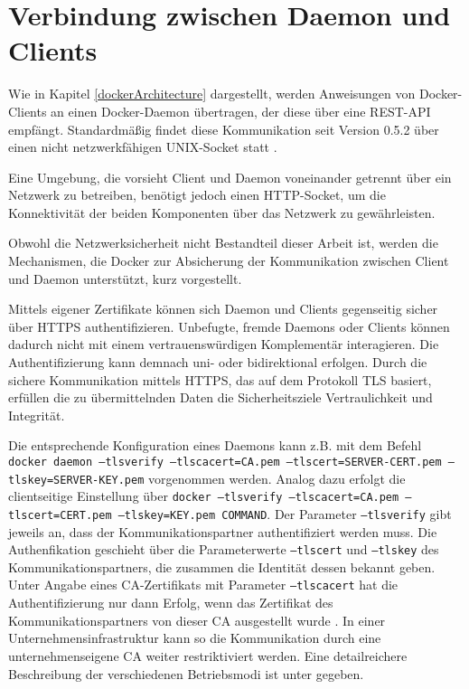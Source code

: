 \documentclass[../main.tex]{subfiles}
\begin{document}


  \section{Verbindung zwischen Daemon und Clients}
  \label{conClientServer}
    Wie in Kapitel \ref{dockerArchitecture} dargestellt, werden Anweisungen von Docker-Clients an einen Docker-Daemon übertragen, der diese über eine REST-API empfängt. Standardmäßig findet diese Kommunikation seit Version 0.5.2 über einen nicht netzwerkfähigen UNIX-Socket statt \cite{ https://docs.docker.com/engine/security/security/ }.

    Eine Umgebung, die vorsieht Client und Daemon voneinander getrennt über ein Netzwerk zu betreiben, benötigt jedoch einen HTTP-Socket, um die Konnektivität der beiden Komponenten über das Netzwerk zu gewährleisten.

    Obwohl die Netzwerksicherheit nicht Bestandteil dieser Arbeit ist, werden die Mechanismen, die Docker zur Absicherung der Kommunikation zwischen Client und Daemon unterstützt, kurz vorgestellt.

    Mittels eigener Zertifikate können sich Daemon und Clients gegenseitig sicher über HTTPS authentifizieren. Unbefugte, fremde Daemons oder Clients können dadurch nicht mit einem vertrauenswürdigen Komplementär interagieren. Die Authentifizierung kann demnach uni- oder bidirektional erfolgen. Durch die sichere Kommunikation mittels HTTPS, das auf dem Protokoll TLS basiert, erfüllen die zu übermittelnden Daten die Sicherheitsziele Vertraulichkeit und Integrität.

    Die entsprechende Konfiguration eines Daemons kann z.B. mit dem Befehl \texttt{docker daemon --tlsverify --tlscacert=CA.pem --tlscert=SERVER-CERT.pem --tlskey=SERVER-KEY.pem} vorgenommen werden. Analog dazu erfolgt die clientseitige Einstellung über \texttt{docker --tlsverify --tlscacert=CA.pem --tlscert=CERT.pem --tlskey=KEY.pem COMMAND}. Der Parameter \texttt{--tlsverify} gibt jeweils an, dass der Kommunikationspartner authentifiziert werden muss. Die Authenfikation geschieht über die Parameterwerte \texttt{--tlscert} und \texttt{--tlskey} des Kommunikationspartners, die zusammen die Identität dessen bekannt geben. Unter Angabe eines CA-Zertifikats mit Parameter \texttt{--tlscacert} hat die Authentifizierung nur dann Erfolg, wenn das Zertifikat des Kommunikationspartners von dieser CA ausgestellt wurde \cite{https://docs.docker.com/engine/security/https/}. In einer Unternehmensinfrastruktur kann so die Kommunikation durch eine unternehmenseigene CA weiter restriktiviert werden. Eine detailreichere Beschreibung der verschiedenen Betriebsmodi ist unter \cite{https://docs.docker.com/engine/security/https/} gegeben.
\end{document}
